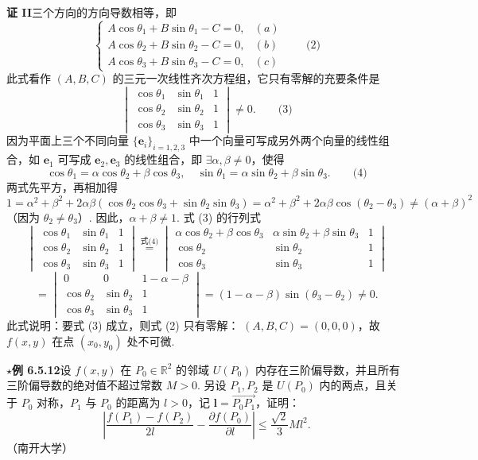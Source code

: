 \documentclass[UTF8, 12pt, fontset=fandol, oneside]{ctexart}
\begin{document}
\noindent\textbf{证 II}\quad 三个方向的方向导数相等，即
\[
\begin{cases}
  A\cos\theta_1+B\sin\theta_1-C=0, &(a)\\
  A\cos\theta_2+B\sin\theta_2-C=0, &(b)\\
  A\cos\theta_3+B\sin\theta_3-C=0, &(c)
\end{cases}\qquad\text{(2)}
\]
此式看作 $(A,B,C)$ 的三元一次线性齐次方程组，它只有零解的充要条件是
\[
  \begin{vmatrix}
    \cos\theta_1&\sin\theta_1&1\\
    \cos\theta_2&\sin\theta_2&1\\
    \cos\theta_3&\sin\theta_3&1
  \end{vmatrix}\ne0. \qquad\text{(3)}
\]
因为平面上三个不同向量 $\{\mathbf e_i\}_{i=1,2,3}$ 中一个向量可写成另外两个向量的线性组合，如 $\mathbf e_1$ 可写成 $\mathbf e_2,\mathbf e_3$ 的线性组合，即 $\exists\alpha,\beta\ne0$，使得
\[
  \cos\theta_1=\alpha\cos\theta_2+\beta\cos\theta_3,\quad
  \sin\theta_1=\alpha\sin\theta_2+\beta\sin\theta_3. \qquad\text{(4)}
\]
两式先平方，再相加得
\[
  1=\alpha^2+\beta^2+2\alpha\beta(\cos\theta_2\cos\theta_3+\sin\theta_2\sin\theta_3)
  =
  \alpha^2+\beta^2+2\alpha\beta\cos(\theta_2-\theta_3)\ne(\alpha+\beta)^2
\]
（因为 $\theta_2\ne\theta_3$）. 因此，$\alpha+\beta\ne1$. 式 (3) 的行列式
\[
\begin{vmatrix}
  \cos\theta_1&\sin\theta_1&1\\
  \cos\theta_2&\sin\theta_2&1\\
  \cos\theta_3&\sin\theta_3&1
\end{vmatrix}
\overset{\text{式(4)}}{=}
\begin{vmatrix}
  \alpha\cos\theta_2+\beta\cos\theta_3&
  \alpha\sin\theta_2+\beta\sin\theta_3&1\\
  \cos\theta_2&\sin\theta_2&1\\
  \cos\theta_3&\sin\theta_3&1
\end{vmatrix}
\]
\[
  =
\begin{vmatrix}
  0&0&1-\alpha-\beta\\
  \cos\theta_2&\sin\theta_2&1\\
  \cos\theta_3&\sin\theta_3&1
\end{vmatrix}
  =(1-\alpha-\beta)\sin(\theta_3-\theta_2)\ne0.
\]
此式说明：要式 (3) 成立，则式 (2) 只有零解：
$(A,B,C)=(0,0,0)$，故 $f(x,y)$ 在点 $(x_0,y_0)$ 处不可微.

\noindent\textbf{\ensuremath{\star}例 6.5.12}\quad 设 $f(x,y)$ 在 $P_0\in\mathbb R^2$ 的邻域 $U(P_0)$ 内存在三阶偏导数，并且所有三阶偏导数的绝对值不超过常数 $M>0$. 另设 $P_1,P_2$ 是 $U(P_0)$ 内的两点，且关于 $P_0$ 对称，$P_1$ 与 $P_0$ 的距离为 $l>0$，记 $\mathbf l=\overrightarrow{P_0P_1}$，证明：
\[
  \left|
  \frac{f(P_1)-f(P_2)}{2l}
  -
  \frac{\partial f(P_0)}{\partial l}
  \right|
  \le
  \frac{\sqrt2}{3}Ml^2.
\]
（南开大学）
\end{document}
